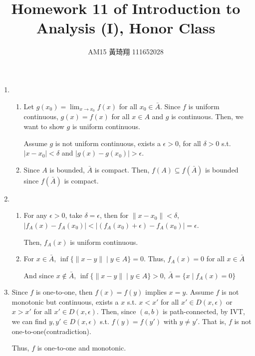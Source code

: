 \documentclass[12pt]{article}
\title{Homework 11 of Introduction to Analysis (I), Honor Class}
\author{AM15 黃琦翔 111652028}
\begin{document}
\maketitle
\begin{enumerate}
    \item \begin{enumerate}
        \item Let $g(x_0) = \displaystyle\lim_{x\to x_0} f(x)$ for all $x_0 \in \bar{A}$.
        Since $f$ is uniform continuous, $g(x) = f(x)$ for all $x\in A$ and $g$ is continuous.
        Then, we want to show $g$ is uniform continuous.

        Assume $g$ is not uniform continuous, exists a $\epsilon > 0$, for all $\delta > 0$ 
        s.t. $|x - x_0| < \delta$ and $|g(x) - g(x_0)| > \epsilon$.

        \item Since $A$ is bounded, $\bar{A}$ is compact.
        Then, $f(A) \subseteq f(\bar{A})$ is bounded since $f(\bar{A})$ is compact.
    \end{enumerate}

    \item \begin{enumerate}
        \item For any $\epsilon > 0$, take $\delta = \epsilon$, then for $\| x - x_0\| < \delta$, $|f_A(x) - f_A(x_0)| < |(f_A(x_0) + \epsilon) -f_A(x_0)| = \epsilon$.
        
        Then, $f_A(x)$ is uniform continuous.

        \item For $x\in \bar{A}$, $\inf\{ \| x-y\| \mid y\in A\} = 0$.
        Thus, $f_A(x) = 0$ for all $x\in \bar{A}$

        And since $x\notin \bar{A}$, $\inf\{ \| x-y\| \mid y\in A\} > 0$, $\bar{A} = \{ x\mid f_A(x) = 0\}$
    \end{enumerate}
    
    \item Since $f$ is one-to-one, then $f(x) = f(y)$ implies $x = y$.
    Assume $f$ is not monotonic but continuous, exists a $x$ s.t. $x < x'$ for all $x' \in D(x, \epsilon)$ 
    or $x > x'$ for all $x' \in D(x, \epsilon)$.
    Then, since $(a, b)$ is path-connected, by IVT, we can find $y, y'\in D(x, \epsilon)$ s.t. $f(y) = f(y')$ with $y \neq y'$.
    That is, $f$ is not one-to-one(contradiction).

    Thus, $f$ is one-to-one and monotonic.
\end{enumerate}
\end{document}
